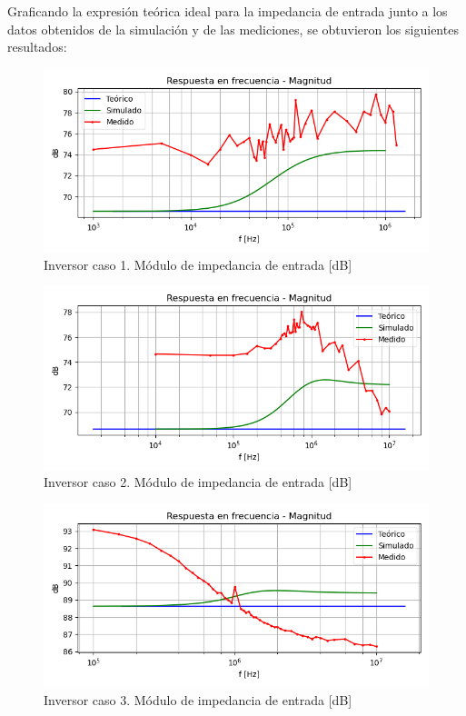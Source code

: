 Graficando la expresión teórica ideal para la impedancia de entrada junto a los datos obtenidos de la simulación y de las mediciones, se obtuvieron los siguientes resultados:

\begin{figure}[H]
	\centering
		\includegraphics[width=.8\linewidth]{./Imagenes/InvCaso1ZinGain.png}  
		\caption{Inversor caso 1. Módulo de impedancia de entrada [dB]}
	\label{fig:circinvcaso1}
\end{figure}

\begin{figure}[H]
	\centering
		\includegraphics[width=.8\linewidth]{./Imagenes/InvCaso2ZinGain.png}  
		\caption{Inversor caso 2. Módulo de impedancia de entrada [dB]}
	\label{fig:circinvcaso1}
\end{figure}

\begin{figure}[H]
	\centering
		\includegraphics[width=.8\linewidth]{./Imagenes/InvCaso3ZinGain.png}  
		\caption{Inversor caso 3. Módulo de impedancia de entrada [dB]}
	\label{fig:circinvcaso1}
\end{figure}

